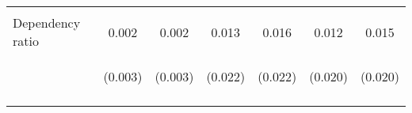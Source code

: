\begin{center}
\begin{tabular}{lcccccc}
\vspace{4pt} & \begin{footnotesize}[0.173]\end{footnotesize} & \begin{footnotesize}[0.139]\end{footnotesize} & \begin{footnotesize}[0.717]\end{footnotesize} & \begin{footnotesize}[0.651]\end{footnotesize} & \begin{footnotesize}[0.787]\end{footnotesize} & \begin{footnotesize}[0.720]\end{footnotesize} \\
Dependency ratio & 0.002 & 0.002 & 0.013 & 0.016 & 0.012 & 0.015 \\
 & \begin{footnotesize}(0.003)\end{footnotesize} & \begin{footnotesize}(0.003)\end{footnotesize} & \begin{footnotesize}(0.022)\end{footnotesize} & \begin{footnotesize}(0.022)\end{footnotesize} & \begin{footnotesize}(0.020)\end{footnotesize} & \begin{footnotesize}(0.020)\end{footnotesize} \\
\vspace{4pt} & \begin{footnotesize}[0.609]\end{footnotesize} & \begin{footnotesize}[0.529]\end{footnotesize} & \begin{footnotesize}[0.557]\end{footnotesize} & \begin{footnotesize}[0.462]\end{footnotesize} & \begin{footnotesize}[0.551]\end{footnotesize} & \begin{footnotesize}[0.456]\end{footnotesize} \\

\end{tabular}
\end{center}
